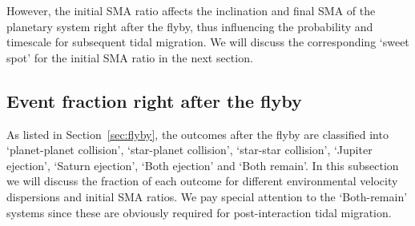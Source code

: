 \documentclass[twocolumn]{aastex63}
\newcommand*\sectn[1]{Section~\ref{#1}}
\begin{document}
However, the initial SMA ratio affects the inclination and final SMA of the planetary system right after the flyby, thus influencing the probability and timescale for subsequent tidal migration. We will discuss the corresponding `sweet spot' for the initial SMA ratio in the next section.

\subsection{Event fraction right after the flyby}
As listed in \sectn{sec:flyby}, the outcomes after the flyby are classified into `planet-planet collision', `star-planet collision', `star-star collision', `Jupiter ejection', `Saturn ejection', `Both ejection' and `Both remain'. In this subsection we will discuss the fraction of each outcome for different environmental velocity dispersions and initial SMA ratios. We pay special attention to the `Both-remain' systems since these are obviously required for post-interaction tidal migration.
\end{document}
